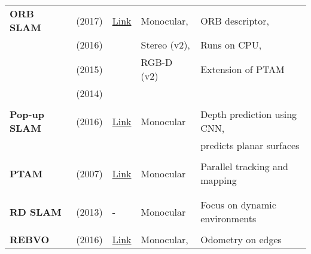{\begin{longtable}{l|l|l|l|l}
			\textbf{ORB SLAM}      & \cite{Mur-Artal2017} (2017)       & \href{https://github.com/raulmur/ORB_SLAM2}{Link}                  &  Monocular,           & ORB descriptor,\\
			& \cite{Mur-Artal} (2016)      &                                                                    &  Stereo (v2),         & Runs on CPU,\\
			& \cite{orbslam} (2015)       &                                                                    &  RGB-D (v2)           & Extension of PTAM\\
			& \cite{Mur-Artal2014} (2014)       &                                                                    &                       &\\
			&                                   &                                                                    &                       &\\
			\textbf{Pop-up SLAM}   & \cite{Yang2016} (2016)            & {\href{https://github.com/shichaoy/pop_up_image}{Link}}            & Monocular             & Depth prediction using CNN, \\
			&         &          &   & predicts planar surfaces\\
			&                                   &                                                                    &                       &\\
			\textbf{PTAM}          & \cite{4538852} (2007)           & {\href{https://github.com/Oxford-PTAM/PTAM-GPL}{Link}}             & Monocular             & Parallel tracking and mapping\\
			&                                   &                                                                    &                       &\\
			&                                   &                                                                    &                       &\\
			\textbf{RD SLAM}       & \cite{Tan2013a} (2013)            & -                                                                  & Monocular             & Focus on dynamic environments\\
			&                                   &                                                                    &                       &\\
			\textbf{REBVO}         & \cite{Tarrio2016} (2016)          & {\href{https://github.com/JuanTarrio/rebvo}{Link}}                 & Monocular,            & Odometry on edges\\

\end{longtable}}
